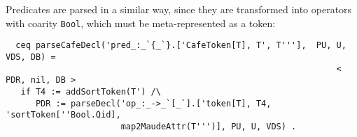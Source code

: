 Predicates are parsed in a similar way, since they are transformed into operators
with coarity \verb"Bool", which must be meta-represented as a token:

{\codesize
\begin{verbatim}
  ceq parseCafeDecl('pred_:_`{_`}.['CafeToken[T], T', T'''],  PU, U, VDS, DB) =
                                                                  < PDR, nil, DB >
   if T4 := addSortToken(T') /\
      PDR := parseDecl('op_:_->_`[_`].['token[T], T4, 'sortToken[''Bool.Qid],
                       map2MaudeAttr(T''')], PU, U, VDS) .
\end{verbatim}
}

{\codesize
\begin{comment}
  ceq parseCafeDecl('pred_:_.['CafeToken[T], T'],  PU, U, VDS, DB) = < PDR, nil, DB >
   if T4 := addSortToken(T') /\
      PDR := parseDecl('op_:_->_.['token[T], T4, 'sortToken[''Bool.Qid]], PU, U, VDS) .
\end{comment}
}

